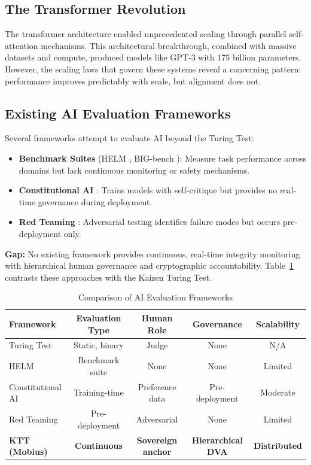 \documentclass[11pt,letterpaper]{article}
\begin{document}
\subsection{The Transformer Revolution}

The transformer architecture \citep{vaswani2017attention} enabled unprecedented scaling through parallel self-attention mechanisms. This architectural breakthrough, combined with massive datasets and compute, produced models like GPT-3 \citep{brown2020language} with 175 billion parameters. However, the scaling laws \citep{kaplan2020scaling} that govern these systems reveal a concerning pattern: performance improves predictably with scale, but alignment does not.

\subsection{Existing AI Evaluation Frameworks}

Several frameworks attempt to evaluate AI beyond the Turing Test:

\begin{itemize}
    \item \textbf{Benchmark Suites} (HELM \citep{liang2022holistic}, BIG-bench \citep{srivastava2022beyond}): Measure task performance across domains but lack continuous monitoring or safety mechanisms.
    
    \item \textbf{Constitutional AI} \citep{bai2022constitutional}: Trains models with self-critique but provides no real-time governance during deployment.
    
    \item \textbf{Red Teaming} \citep{ganguli2022red}: Adversarial testing identifies failure modes but occurs pre-deployment only.
\end{itemize}

\textbf{Gap:} No existing framework provides continuous, real-time integrity monitoring with hierarchical human governance and cryptographic accountability. Table~\ref{tab:comparison} contrasts these approaches with the Kaizen Turing Test.

\begin{table}[h]
\centering
\caption{Comparison of AI Evaluation Frameworks}
\label{tab:comparison}
\begin{tabular}{@{}lcccc@{}}
\toprule
\textbf{Framework} & \textbf{Evaluation Type} & \textbf{Human Role} & \textbf{Governance} & \textbf{Scalability} \\
\midrule
Turing Test & Static, binary & Judge & None & N/A \\
HELM & Benchmark suite & None & None & Limited \\
Constitutional AI & Training-time & Preference data & Pre-deployment & Moderate \\
Red Teaming & Pre-deployment & Adversarial & None & Limited \\
\textbf{KTT (Mobius)} & \textbf{Continuous} & \textbf{Sovereign anchor} & \textbf{Hierarchical DVA} & \textbf{Distributed} \\
\bottomrule
\end{tabular}
\end{table}
\end{document}
